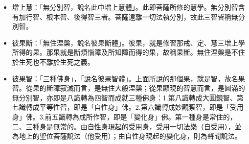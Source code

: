 \begin{itemize}
  \item 增上慧：「無分別智，說名此中增上慧體」。此即菩薩所修的慧學。無分別智含有加行智、根本智、後得智三者。菩薩遠離一切法執分別，故此三智皆稱無分別智。
  \item 彼果斷：「無住涅槃，說名彼果斷體」。彼果，就是修習那戒、定、慧三增上學所得的果。那果就是斷煩惱障及所知障而得的果，故稱果斷。無住涅槃是不住於生死也不離於生死之義。
  \item 彼果智：「三種佛身」，「說名彼果智體」。上面所說的那個果，就是智，故名果智。從果的斷障寂滅而言，是無住大般涅槃；從果顯現的智慧而言，是圓滿的無分別智，亦即是八識轉為四智而成就三種佛身：1.第八識轉成大圓鏡智、第七識轉成平等性智，即是「自性身」佛。2.第六識轉成妙觀察智，即是「受用身」佛。3.前五識轉為成所作智，即是「變化身」佛。第一種身是常住的，二、三種身是無常的。由自性身現起的受用身，受用一切法樂（自受用），並為地上的聖位菩薩說法（他受用）；由自性身現起的變化身，則為聲聞說法。
\end{itemize}
